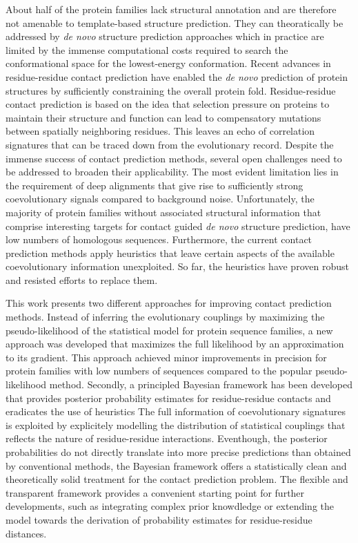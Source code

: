 \documentclass[11pt,a4paper,twoside]{book}
\theoremstyle{definition}
\theoremstyle{definition}
\theoremstyle{remark}
\begin{document}
About half of the protein families lack structural annotation and are
therefore not amenable to template-based structure prediction. They can
theoratically be addressed by \emph{de novo} structure prediction
approaches which in practice are limited by the immense computational
costs required to search the conformational space for the lowest-energy
conformation. Recent advances in residue-residue contact prediction have
enabled the \emph{de novo} prediction of protein structures by
sufficiently constraining the overall protein fold. Residue-residue
contact prediction is based on the idea that selection pressure on
proteins to maintain their structure and function can lead to
compensatory mutations between spatially neighboring residues. This
leaves an echo of correlation signatures that can be traced down from
the evolutionary record. Despite the immense success of contact
prediction methods, several open challenges need to be addressed to
broaden their applicability. The most evident limitation lies in the
requirement of deep alignments that give rise to sufficiently strong
coevolutionary signals compared to background noise. Unfortunately, the
majority of protein families without associated structural information
that comprise interesting targets for contact guided \emph{de novo}
structure prediction, have low numbers of homologous sequences.
Furthermore, the current contact prediction methods apply heuristics
that leave certain aspects of the available coevolutionary information
unexploited. So far, the heuristics have proven robust and resisted
efforts to replace them.

This work presents two different approaches for improving contact
prediction methods. Instead of inferring the evolutionary couplings by
maximizing the pseudo-likelihood of the statistical model for protein
sequence families, a new approach was developed that maximizes the full
likelihood by an approximation to its gradient. This approach achieved
minor improvements in precision for protein families with low numbers of
sequences compared to the popular pseudo-likelihood method. Secondly, a
principled Bayesian framework has been developed that provides posterior
probability estimates for residue-residue contacts and eradicates the
use of heuristics The full information of coevolutionary signatures is
exploited by explicitely modelling the distribution of statistical
couplings that reflects the nature of residue-residue interactions.
Eventhough, the posterior probabilities do not directly translate into
more precise predictions than obtained by conventional methods, the
Bayesian framework offers a statistically clean and theoretically solid
treatment for the contact prediction problem. The flexible and
transparent framework provides a convenient starting point for further
developments, such as integrating complex prior knowdledge or extending
the model towards the derivation of probability estimates for
residue-residue distances.
\end{document}
